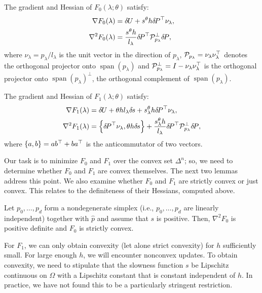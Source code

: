 \documentclass[sisc-eikonal.tex]{subfiles}
\begin{document}
\begin{proposition}\label{prop:F0-grad-and-Hess}
  The gradient and Hessian of $F_0(\lambda; \theta)$ satisfy:
  \begin{align}
    \nabla F_0(\lambda) &= \delU + s^{\theta} h \delP^\top \nu_\lambda,\label{eq:F0-grad} \\
    \nabla^2 F_0(\lambda) &= \frac{s^{\theta} h}{l_\lambda} \delP^\top \calP^\perp_{p_\lambda} \delP,
  \end{align}
  where $\nu_\lambda = p_\lambda/l_\lambda$ is the unit vector in the
  direction of $p_\lambda$,
  $\mathcal{P}_{p_\lambda} = \nu_\lambda \nu_\lambda^\top$ denotes the
  orthogonal projector onto $\operatorname{span}(p_\lambda)$ and
  $\mathcal{P}_{p_\lambda}^\perp = I - \nu_\lambda \nu_\lambda^\top$ is the
  orthogonal projector onto $\operatorname{span}(p_\lambda)^\perp$,
  the orthogonal complement of $\operatorname{span}(p_\lambda)$.
\end{proposition}

\begin{proposition}\label{prop:F1-grad-and-Hess}
  The gradient and Hessian of $F_1(\lambda; \theta)$ satisfy:
  \begin{align}
    \nabla F_1(\lambda) &= \delU + \theta h l_\lambda \dels + s^{\theta}_\lambda h \delP^\top \nu_\lambda, \\
    \nabla^2 F_1(\lambda) &= \set{\delP^\top \nu_\lambda, \theta h \dels} + \frac{s^\theta_\lambda h}{l_\lambda} \delP^\top \calP^\perp_{p_\lambda} \delP, \label{eq:hess-F1}
  \end{align}
  where $\left\{a, b\right\} = ab^\top + ba^\top$ is the anticommutator of two
  vectors.
\end{proposition}

Our task is to minimize $F_0$ and $F_1$ over the convex set
$\Delta^n$; so, we need to determine whether $F_0$ and $F_1$ are
convex themselves. The next two lemmas address this point. We also
examine whether $F_0$ and $F_1$ are strictly convex or just
convex. This relates to the definiteness of their Hessians, computed
above.

\begin{lemma}\label{lemma:dPt-cprojp-dP-pd}
  Let $p_0, \hdots, p_d$ form a nondegenerate simplex (i.e.,
  $p_0, \hdots, p_d$ are linearly independent) together with $\hat{p}$
  and assume that $s$ is positive. Then, $\nabla^2 F_0$ is positive
  definite and $F_0$ is strictly convex.
\end{lemma}

For $F_1$, we can only obtain convexity (let alone strict convexity)
for $h$ sufficiently small. For large enough $h$, we will encounter
nonconvex updates. To obtain convexity, we need to stipulate that the
slowness function $s$ be Lipschitz continuous on $\Omega$ with a
Lipschitz constant that is constant independent of $h$. In practice,
we have not found this to be a particularly stringent restriction.
\end{document}
